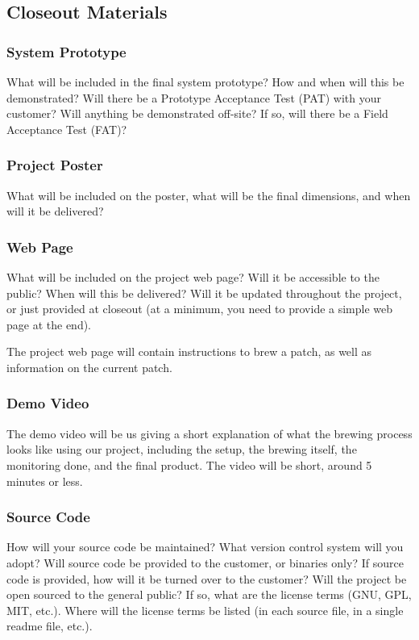\subsection{Closeout Materials}

\subsubsection{System Prototype}
What will be included in the final system prototype? How and when will this be demonstrated? Will there be a Prototype Acceptance Test (PAT) with your customer? Will anything be demonstrated off-site? If so, will there be a Field Acceptance Test (FAT)?

\subsubsection{Project Poster}
What will be included on the poster, what will be the final dimensions, and when will it be delivered?

\subsubsection{Web Page}
What will be included on the project web page? Will it be accessible to the public? When will this be delivered? Will it be updated throughout the project, or just provided at closeout (at a minimum, you need to provide a simple web page at the end).

The project web page will contain instructions to brew a patch, as well as information on the current patch.

\subsubsection{Demo Video}
The demo video will be us giving a short explanation of what the brewing process looks like using our project, including the setup, the brewing itself, the monitoring done, and the final product. The video will be short, around 5 minutes or less.

\subsubsection{Source Code}
How will your source code be maintained? What version control system will you adopt? Will source code be provided to the customer, or binaries only? If source code is provided, how will it be turned over to the customer? Will the project be open sourced to the general public? If so, what are the license terms (GNU, GPL, MIT, etc.). Where will the license terms be listed (in each source file, in a single readme file, etc.).

